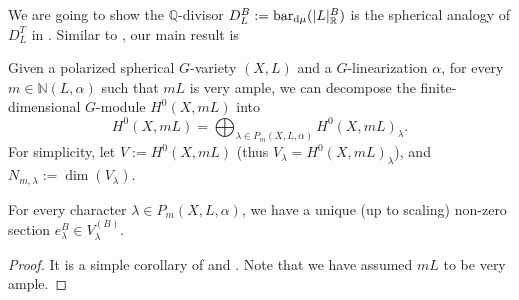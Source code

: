 


We are going to show the $\mathbb{Q}$-divisor $D^B_L := \mathrm{bar}_{\mathrm{d} \mu}(\mathopen{}\left|L\right|\mathclose{}_\mathbb{R}^B)$ is the spherical analogy of $D^T_L$ in . Similar to , our main result is

Given a polarized spherical $G$-variety $(X, L)$ and a $G$-linearization $\alpha$, for every $m \in \mathbb{N}(L, \alpha)$ such that $m L$ is very ample, we can decompose the finite-dimensional $G$-module $H^0(X, m L)$ into
\begin{equation}\label{eq:decompSph}
	H^0(X, m L) = \bigoplus_{\lambda \in P_m(X, L, \alpha)} H^0(X, m L)_\lambda .
\end{equation}
For simplicity, let $V := H^0(X, m L)$ (thus $V_\lambda = H^0(X, m L)_\lambda$), and $N_{m, \lambda} := \dim(V_\lambda)$.

For every character $\lambda \in P_m(X, L, \alpha)$, we have a unique (up to scaling) non-zero section $e^B_\lambda \in V^{(B)}_\lambda$.

\begin{proof}
	It is a simple corollary of  and . Note that we have assumed $m L$ to be very ample.
\end{proof}

